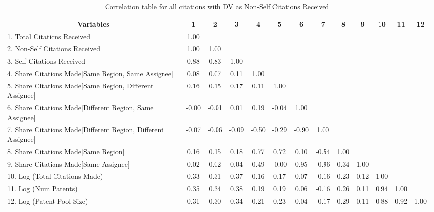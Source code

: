 \begin{table}[htbp]\centering \caption{Correlation table for all citations  with DV as Non-Self Citations Received\label{a.e.o.t.n.ncorrelation}}
\scriptsize
\singlespacing
\begin{adjustbox}{angle=90}
\begin{tabular}{l  c  c  c  c  c  c  c  c  c  c  c  c }\hline\hline
\multicolumn{1}{c}{Variables} &1&2&3&4&5&6&7&8&9&10&11&12\\ \hline
1. Total Citations Received&1.00\\
2. Non-Self Citations Received&1.00&1.00\\
3. Self Citations Received&0.88&0.83&1.00\\
4. Share Citations Made[Same Region, Same Assignee]&0.08&0.07&0.11&1.00\\
5. Share Citations Made[Same Region, Different Assignee]&0.16&0.15&0.17&0.11&1.00\\
6. Share Citations Made[Different Region, Same Assignee]&-0.00&-0.01&0.01&0.19&-0.04&1.00\\
7. Share Citations Made[Different Region, Different Assignee]&-0.07&-0.06&-0.09&-0.50&-0.29&-0.90&1.00\\
8. Share Citations Made[Same Region]&0.16&0.15&0.18&0.77&0.72&0.10&-0.54&1.00\\
9. Share Citations Made[Same Assignee]&0.02&0.02&0.04&0.49&-0.00&0.95&-0.96&0.34&1.00\\
10. Log (Total Citations Made)&0.33&0.31&0.37&0.16&0.17&0.07&-0.16&0.23&0.12&1.00\\
11. Log (Num Patents)&0.35&0.34&0.38&0.19&0.19&0.06&-0.16&0.26&0.11&0.94&1.00\\
12. Log (Patent Pool Size)&0.31&0.30&0.34&0.21&0.23&0.04&-0.17&0.29&0.11&0.88&0.92&1.00\\
\hline \hline 
 \end{tabular}
 \end{adjustbox}
\end{table}

